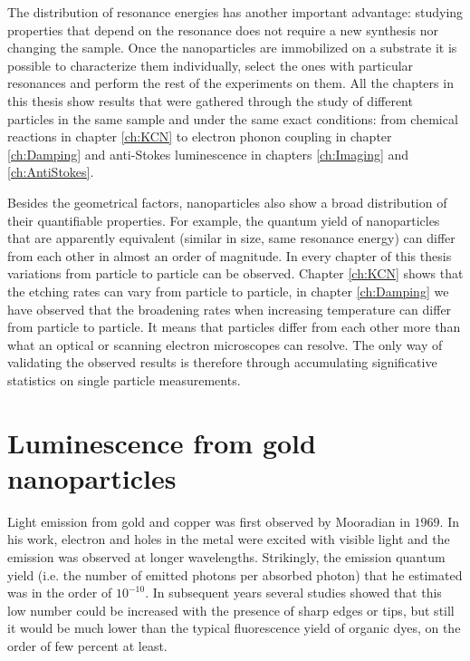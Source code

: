The distribution of resonance energies has another important advantage: studying
properties that depend on the resonance does not require a new synthesis nor
changing the sample. Once the nanoparticles are immobilized on a substrate it is
possible to characterize them individually, select the ones with particular
resonances and perform the rest of the experiments on them. All the chapters in
this thesis show results that were gathered through the study of different
particles in the same sample and under the same exact conditions: from chemical
reactions in chapter \ref{ch:KCN} to electron phonon coupling in chapter
\ref{ch:Damping} and anti-Stokes luminescence in chapters \ref{ch:Imaging} and
\ref{ch:AntiStokes}.

Besides the geometrical factors, nanoparticles also show a broad distribution of
their quantifiable properties. For example, the quantum yield of nanoparticles
that are apparently equivalent (similar in size, same resonance energy) can
differ from each other in almost an order of magnitude\cite{Yorulmaz2012}. In
every chapter of this thesis variations from particle to particle can be
observed. Chapter \ref{ch:KCN} shows that the etching rates can vary from
particle to particle, in chapter \ref{ch:Damping} we have observed that the
broadening rates when increasing temperature can differ from particle to
particle. It means that particles differ from each other more than what an
optical or scanning electron microscopes can resolve. The only way of validating
the observed results is therefore through accumulating significative statistics
on single particle measurements.

\section{Luminescence from gold nanoparticles}
\label{sec:luminescence}
Light emission from gold and copper was first observed by
Mooradian\cite{Mooradian1969} in $1969$. In his work, electron and holes in the
metal were excited with visible light and the emission was observed at longer
wavelengths. Strikingly, the emission quantum yield (i.e. the number of emitted
photons per absorbed photon) that he estimated was in the order of $10^{-10}$.
In subsequent years several studies showed that this low number could be
increased with the presence of sharp edges\cite{boyd1986photoinduced} or
tips\cite{Mohamed2000}, but still it would be much lower than the typical
fluorescence yield of organic dyes, on the order of few percent at least.

